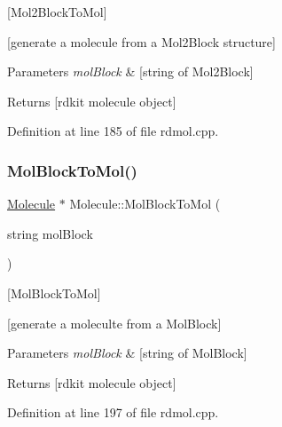 \mbox{[}Mol2\+Block\+To\+Mol\mbox{]} 

\mbox{[}generate a molecule from a Mol2\+Block structure\mbox{]}


\begin{DoxyParams}{Parameters}
{\em mol\+Block} & \mbox{[}string of Mol2\+Block\mbox{]} \\
\hline
\end{DoxyParams}
\begin{DoxyReturn}{Returns}
\mbox{[}rdkit molecule object\mbox{]} 
\end{DoxyReturn}


Definition at line 185 of file rdmol.\+cpp.

\mbox{\label{class_molecule_a75b3d11ee3b2ccacad2f5ae1c6909b19}} 
\subsubsection{\texorpdfstring{Mol\+Block\+To\+Mol()}{MolBlockToMol()}}
{\footnotesize\ttfamily \mbox{\hyperlink{class_molecule}{Molecule}} $\ast$ Molecule\+::\+Mol\+Block\+To\+Mol (\begin{DoxyParamCaption}\item[{string}]{mol\+Block }\end{DoxyParamCaption})\hspace{0.3cm}{\ttfamily [static]}}



\mbox{[}Mol\+Block\+To\+Mol\mbox{]} 

\mbox{[}generate a moleculte from a Mol\+Block\mbox{]}


\begin{DoxyParams}{Parameters}
{\em mol\+Block} & \mbox{[}string of Mol\+Block\mbox{]} \\
\hline
\end{DoxyParams}
\begin{DoxyReturn}{Returns}
\mbox{[}rdkit molecule object\mbox{]} 
\end{DoxyReturn}


Definition at line 197 of file rdmol.\+cpp.

\mbox{\label{class_molecule_a2425937fefa34d28560ef4ad152b9602}} 
